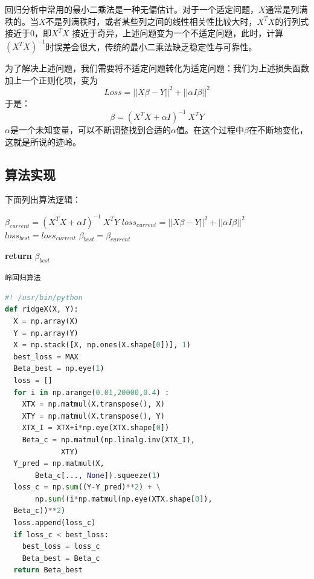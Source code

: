 \documentclass{ctexart}
\begin{document}
回归分析中常用的最小二乘法是一种无偏估计。对于一个适定问题，$X$通常是列满秩的。当$X$不是列满秩时，或者某些列之间的线性相关性比较大时，$X^TX$的行列式接近于0，即$X^TX$
接近于奇异，上述问题变为一个不适定问题，此时，计算$(X^TX)^{-1}$时误差会很大，传统的最小二乘法缺乏稳定性与可靠性。

为了解决上述问题，我们需要将不适定问题转化为适定问题：我们为上述损失函数加上一个正则化项，变为
\begin{equation}
	Loss = ||X\beta - Y||^2 + ||\alpha I\beta||^2
\end{equation}
于是：
\begin{equation}
		\beta = (X^TX + \alpha I)^{-1} \ X^T Y
\end{equation}
$\alpha$是一个未知变量，可以不断调整找到合适的$\alpha$值。在这个过程中$\beta$在不断地变化，这就是所说的迹岭。
\subsection{算法实现}
下面列出算法逻辑：
\begin{center}
	\begin{minipage}{0.5\linewidth} %
		\begin{algorithm}[H]
			\medskip
			
			{
				{$\beta_{current} = (X^TX + \alpha I)^{-1} \ X^T Y$} \;
				{$loss_{current} = ||X\beta - Y||^2 + ||\alpha I\beta||^2$} \;
				{
					$loss_{best} = loss_{current}$ \;
					$\beta_{best} = \beta_{current}$
				}
			}
			
			{\bf return} $\beta_{best}$ \;
			\caption{\texttt{岭回归算法}} %
			\label{alg:fastTwoSum}   %
		\end{algorithm}
	\end{minipage}
\end{center}
\begin{file}[ridge.py]
	\begin{lstlisting}[language=Python]
	#! /usr/bin/python
def ridgeX(X, Y):
  X = np.array(X)
  Y = np.array(Y)
  X = np.stack([X, np.ones(X.shape[0])], 1)
  best_loss = MAX
  Beta_best = np.eye(1)
  loss = []
  for i in np.arange(0.01,20000,0.4) :
    XTX = np.matmul(X.transpose(), X)
    XTY = np.matmul(X.transpose(), Y)
    XTX_I = XTX+i*np.eye(XTX.shape[0])
    Beta_c = np.matmul(np.linalg.inv(XTX_I),
             XTY)
  Y_pred = np.matmul(X,
       Beta_c[..., None]).squeeze(1)
  loss_c = np.sum((Y-Y_pred)**2) + \
       np.sum((i*np.matmul(np.eye(XTX.shape[0]),
  Beta_c))**2)
  loss.append(loss_c)
  if loss_c < best_loss:
    best_loss = loss_c
    Beta_best = Beta_c
  return Beta_best
	\end{lstlisting}
\end{file}
\end{document}
